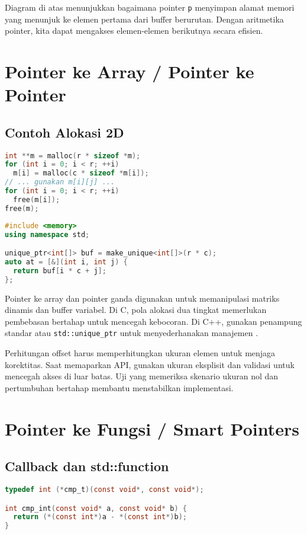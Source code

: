 \documentclass[../main.tex]{subfiles}
\begin{document}
Diagram di atas menunjukkan bagaimana pointer \texttt{p} menyimpan alamat memori yang menunjuk ke elemen pertama dari buffer berurutan. Dengan aritmetika pointer, kita dapat mengakses elemen-elemen berikutnya secara efisien.

\section{Pointer ke Array / Pointer ke Pointer}
\subsection{Contoh Alokasi 2D}
\begin{lstlisting}[language=C, caption={Matriks dinamis 2D di C (pointer ganda)}]
int **m = malloc(r * sizeof *m);
for (int i = 0; i < r; ++i)
  m[i] = malloc(c * sizeof *m[i]);
// ... gunakan m[i][j] ...
for (int i = 0; i < r; ++i)
  free(m[i]);
free(m);
\end{lstlisting}

\begin{lstlisting}[language=C++, caption={std::unique\_ptr\textless T[]\textgreater{} untuk buffer 2D datar}]
#include <memory>
using namespace std;

unique_ptr<int[]> buf = make_unique<int[]>(r * c);
auto at = [&](int i, int j) {
  return buf[i * c + j];
};
\end{lstlisting}
Pointer ke array dan pointer ganda digunakan untuk memanipulasi matriks dinamis dan buffer variabel. Di C, pola alokasi dua tingkat memerlukan pembebasan bertahap untuk mencegah kebocoran. Di C++, gunakan penampung standar atau \texttt{std::unique\_ptr} untuk menyederhanakan manajemen \parencite{iso-c-draft-n1570,cpp-reference}.

Perhitungan offset harus memperhitungkan ukuran elemen untuk menjaga korektitas. Saat memaparkan API, gunakan ukuran eksplisit dan validasi untuk mencegah akses di luar batas. Uji yang memeriksa skenario ukuran nol dan pertumbuhan bertahap membantu menstabilkan implementasi.

\section{Pointer ke Fungsi / Smart Pointers}
\subsection{Callback dan std::function}
\begin{lstlisting}[language=C, caption={Pointer ke fungsi di C}]
typedef int (*cmp_t)(const void*, const void*);

int cmp_int(const void* a, const void* b) {
  return (*(const int*)a - *(const int*)b);
}
\end{lstlisting}
\end{document}
